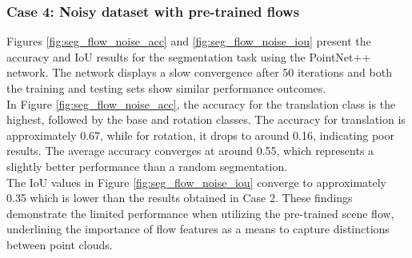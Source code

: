 \subsubsection{Case 4: Noisy dataset with pre-trained flows}

Figures \ref{fig:seg_flow_noise_acc} and \ref{fig:seg_flow_noise_iou} present the accuracy and IoU results for the segmentation task using the PointNet++ network. The network displays a slow convergence after 50 iterations and both the training and testing sets show similar performance outcomes.\\

In Figure \ref{fig:seg_flow_noise_acc}, the accuracy for the translation class is the highest, followed by the base and rotation classes. The accuracy for translation is approximately 0.67, while for rotation, it drops to around 0.16, indicating poor results. The average accuracy converges at around 0.55, which represents a slightly better performance than a random segmentation.\\

The IoU values in Figure \ref{fig:seg_flow_noise_iou} converge to approximately 0.35 which is lower than the results obtained in Case 2. These findings demonstrate the limited performance when utilizing the pre-trained scene flow, underlining the importance of flow features as a means to capture distinctions between point clouds.

